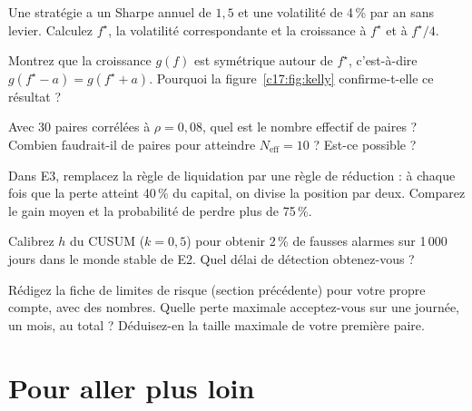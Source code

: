 \begin{exercise}
Une stratégie a un Sharpe annuel de $1{,}5$ et une volatilité de 4\,\% par an sans levier. Calculez $f^\star$, la volatilité correspondante et la croissance à $f^\star$ et à $f^\star/4$.
\end{exercise}

\begin{exercise}
Montrez que la croissance $g(f)$ est symétrique autour de $f^\star$, c'est-à-dire $g(f^\star - a) = g(f^\star + a)$. Pourquoi la figure~\ref{c17:fig:kelly} confirme-t-elle ce résultat ?
\end{exercise}

\begin{exercise}
Avec 30 paires corrélées à $\rho = 0{,}08$, quel est le nombre effectif de paires ? Combien faudrait-il de paires pour atteindre $N_{\text{eff}} = 10$ ? Est-ce possible ?
\end{exercise}

\begin{exercise}[à coder]
Dans E3, remplacez la règle de liquidation par une règle de réduction : à chaque fois que la perte atteint 40\,\% du capital, on divise la position par deux. Comparez le gain moyen et la probabilité de perdre plus de 75\,\%.
\end{exercise}

\begin{exercise}[à coder]
Calibrez $h$ du CUSUM ($k = 0{,}5$) pour obtenir 2\,\% de fausses alarmes sur 1\,000 jours dans le monde stable de E2. Quel délai de détection obtenez-vous ?
\end{exercise}

\begin{exercise}
Rédigez la fiche de limites de risque (section précédente) pour votre propre compte, avec des nombres. Quelle perte maximale acceptez-vous sur une journée, un mois, au total ? Déduisez-en la taille maximale de votre première paire.
\end{exercise}

\section{Pour aller plus loin}

